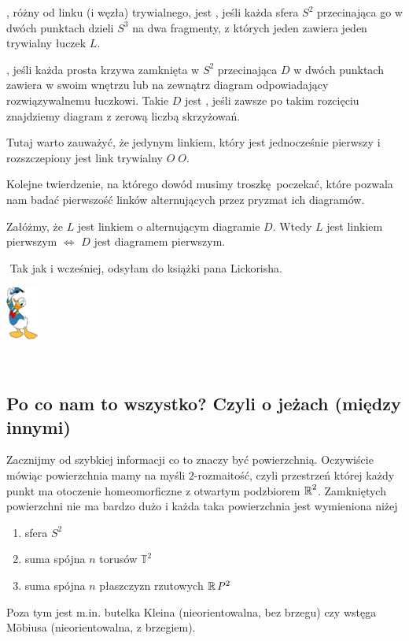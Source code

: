 \documentclass{article}
\renewenvironment{proof}{{\bfseries\color{orange} Dowód}$ $\newline}{
  \begin{flushright}\includegraphics[width=30pt]{Donald_Duck.png}\end{flushright}$ $\newline
}
\begin{document}
\begin{deff}
  , różny od linku (i węzła) trywialnego, jest , jeśli każda sfera $S^2$ przecinająca go w dwóch punktach dzieli $S^3$ na dwa fragmenty, z których jeden zawiera jeden trywialny łuczek $L$.

  , jeśli każda prosta krzywa zamknięta w $S^2$ przecinająca $D$ w dwóch punktach zawiera w swoim wnętrzu lub na zewnątrz diagram odpowiadający rozwiązywalnemu łuczkowi. Takie $D$ jest , jeśli zawsze po takim rozcięciu znajdziemy diagram z zerową liczbą skrzyżowań. 
\end{deff}

Tutaj warto zauważyć, że jedynym linkiem, który jest jednocześnie pierwszy i rozszczepiony jest link trywialny $O\;O$.

Kolejne twierdzenie, na którego dowód musimy troszkę poczekać, które pozwala nam badać pierwszość linków alternujących przez pryzmat ich diagramów.
\begin{thm}
  Załóżmy, że $L$ jest linkiem o alternującym diagramie $D$. Wtedy $L$ jest linkiem pierwszym $\iff$ $D$ jest diagramem pierwszym.
\end{thm}

\begin{proof}
  Tak jak i wcześniej, odsyłam do książki pana Lickorisha.
\end{proof}

\subsection{Po co nam to wszystko? Czyli o jeżach (między innymi)}

Zacznijmy od szybkiej informacji co to znaczy być powierzchnią. Oczywiście mówiąc powierzchnia mamy na myśli $2$-rozmaitość, czyli przestrzeń której każdy punkt ma otoczenie homeomorficzne z otwartym podzbiorem $\operatorname{\mathbb{R}}^2$. Zamkniętych powierzchni nie ma bardzo dużo i każda taka powierzchnia jest wymieniona niżej
\begin{enumerate}
  \item sfera $S^2$
  \item suma spójna $n$ torusów $\mathbb{T}^2$
  \item suma spójna $n$ płaszczyzn rzutowych $\operatorname{\mathbb{R}} P^2$
\end{enumerate}
Poza tym jest m.in. butelka Kleina (nieorientowalna, bez brzegu) czy wstęga M\"obiusa (nieorientowalna, z brzegiem).
\end{document}
